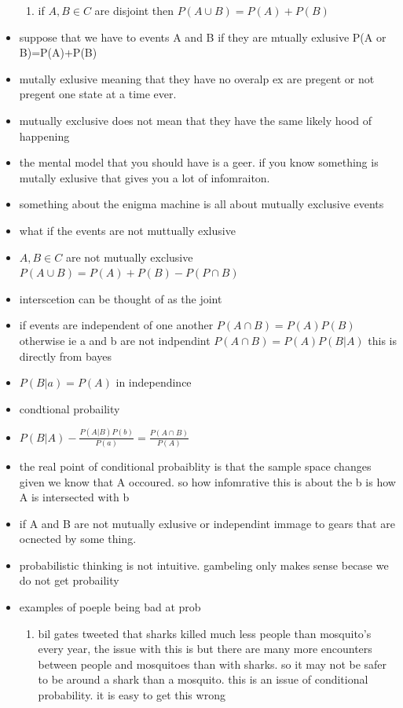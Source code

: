 \documentclass{article}
\begin{document}
\begin{itemize}
\begin{enumerate}
    \item if $A,B\in C$ are disjoint then $P(A\cup B)=P(A)+P(B)$
\end{enumerate}
\item suppose that we have to events A and B if they are mtually exlusive P(A or B)=P(A)+P(B)
\item mutally exlusive meaning that they have no overalp ex are pregent or not pregent one state at a time ever.  
\item mutually exclusive does not mean that they have the same likely hood of happening 
\item the mental model that you should have is a geer. if you know something is mutally exlusive that gives you a lot of infomraiton. 
\item something about the enigma machine is all about mutually exclusive events 
\item what if the events are not muttually exlusive 
\item $A,B\in C$ are not mutually exclusive $P(A\cup B)=P(A)+P(B)-P(P\cap B)$
\item interscetion can be thought of as the joint
\item if events are independent of one another $P(A\cap B)=P(A)P(B)$
\itme otherwise ie a and b are not indpendint  $P(A\cap B)=P(A)P(B|A)$ this is directly from bayes 
\item $P(B|a)=P(A)$ in independince 
\item condtional probaility 
\item $P(B|A)-\frac{P(A|B)P(b)}{P(a)}=\frac{P(A\cap B)}{P(A)}$
\item the real point of conditional probaiblity is that the sample space changes given we know that A occoured. so how infomrative this is about the b is how A is intersected with b 
\item if A and B are not mutually exlusive or independint immage to gears that are ocnected by some thing. 
\item probabilistic thinking is not intuitive. gambeling only makes sense becase we do not get probaility
\item examples of poeple being bad at prob
\begin{enumerate}
    \item bil gates tweeted that sharks killed much less people than mosquito's every year, the issue with this is but there are many more encounters between people and mosquitoes than with sharks. so it may not be safer to be around a shark than a mosquito. this is an issue of conditional probability. it is easy to get this wrong

\end{enumerate}
\end{itemize}
\end{document}
